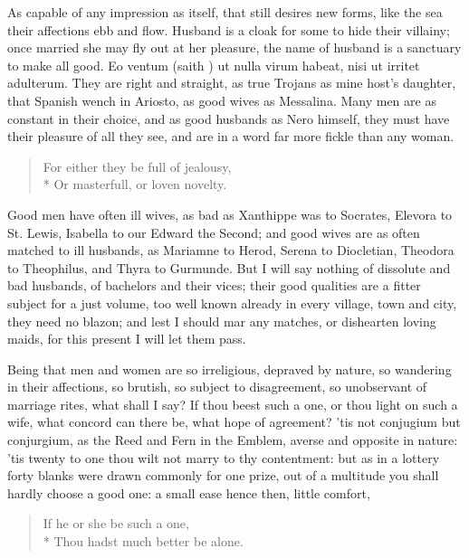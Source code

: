 As capable of any impression as  itself, that still
desires new forms, like the sea their affections ebb and flow. Husband
is a cloak for some to hide their villainy; once married she may fly
out at her pleasure, the name of husband is a sanctuary to make all
good. Eo ventum (saith \Seneca{}) ut nulla virum habeat, nisi ut irritet
adulterum. They are right and straight, as true Trojans as mine host's
daughter, that Spanish wench in Ariosto, as good wives as
Messalina. Many men are as constant in their choice, and as good
husbands as Nero himself, they must have their pleasure of all they
see, and are in a word far more fickle than any woman.
%
\begin{verse}
For either they be full of jealousy,\\*
Or masterfull, or loven novelty.
\end{verse}
%
Good men have often ill wives, as bad as Xanthippe was to Socrates,
Elevora to St. Lewis, Isabella to our Edward the Second; and good wives
are as often matched to ill husbands, as Mariamne to Herod, Serena to
Diocletian, Theodora to Theophilus, and Thyra to Gurmunde. But I will
say nothing of dissolute and bad husbands, of bachelors and their
vices; their good qualities are a fitter subject for a just volume, too
well known already in every village, town and city, they need no
blazon; and lest I should mar any matches, or dishearten loving maids,
for this present I will let them pass.

Being that men and women are so irreligious, depraved by nature, so
wandering in their affections, so brutish, so subject to disagreement,
so unobservant of marriage rites, what shall I say? If thou beest such
a one, or thou light on such a wife, what concord can there be, what
hope of agreement? 'tis not conjugium but conjurgium, as the Reed and
Fern in the Emblem, averse and opposite in nature: 'tis twenty to
one thou wilt not marry to thy contentment: but as in a lottery forty
blanks were drawn commonly for one prize, out of a multitude you shall
hardly choose a good one: a small ease hence then, little comfort,

\begin{verse}
If he or she be such a one,\\*
Thou hadst much better be alone.
\end{verse}

